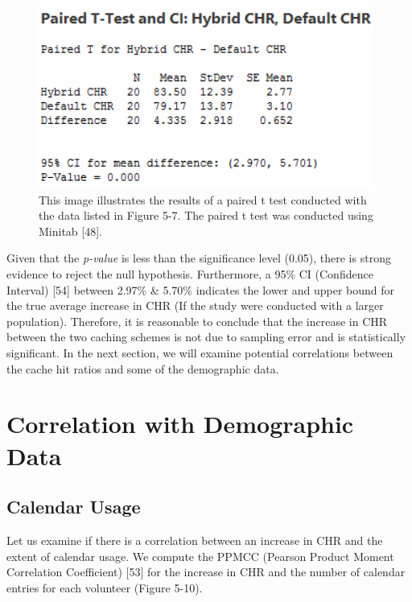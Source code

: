 \documentclass[12pt]{uthesis-v12}  %
\begin{document}
			\begin{figure}[h]
				\centering
				\includegraphics[width = 110mm]{images/pairedTest.png}
				\caption[Paired T Test Resuts]{ This image illustrates the results of a paired t test conducted with the data listed in Figure 5-7. The paired t test was conducted using Minitab [48].}
			\end{figure}			
		
			Given that the {\em p-value} is less than the significance level (0.05), there is strong evidence to reject the null hypothesis. Furthermore, a 95\% CI (Confidence Interval) [54] between 2.97\% \& 5.70\% indicates the lower and upper bound for the true average increase in CHR (If the study were conducted with a larger population). Therefore, it is reasonable to conclude that the increase in CHR between the two caching schemes is not due to sampling error and is statistically significant. In the next section, we will examine potential correlations between the cache hit ratios and some of the demographic data.
			
		\section{Correlation with Demographic Data}
			
			\subsection{Calendar Usage}
			 Let us examine if there is a correlation between an increase in CHR and the extent of calendar usage. We compute the PPMCC (Pearson Product Moment Correlation Coefficient) [53] for the increase in CHR and the number of calendar entries for each volunteer (Figure 5-10). 
				
\end{document}
